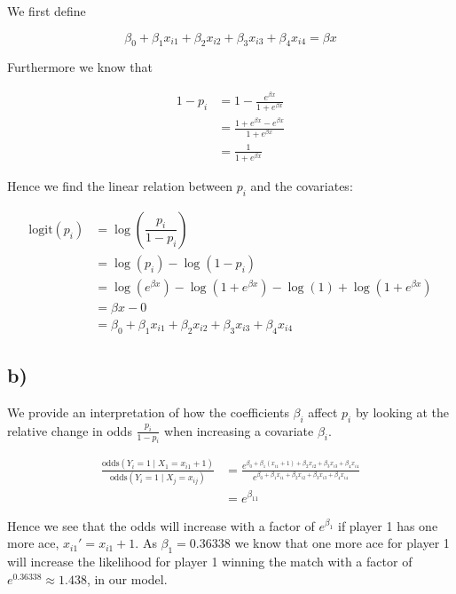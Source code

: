 \documentclass[
]{article}
\begin{document}
We first define

\[
\beta_0 + \beta_1x_{i1} + \beta_2 x_{i2} + \beta_3x_{i3} + \beta_4 x_{i4} = \beta x
\]

Furthermore we know that

\[
\begin{aligned}
1-p_i &= 1 - \frac{e^{\beta x}}{1+e^{\beta x}} \\
&= \frac{1 + e^{\beta x} - e^{\beta x}}{1+e^{\beta x}} \\
&= \frac{1}{1+e^{\beta x}}
\end{aligned}
\]

Hence we find the linear relation between \(p_i\) and the covariates:

\[
\begin{aligned}
\text{logit}(p_i) &= \log(\dfrac{p_i}{1-p_i}) \\
&=  \log(p_i) - \log({1 - p_i}) \\
&=  \log(e^{\beta x}) - \log(1 + e^{\beta x}) - \log(1) + \log({1 + e^{\beta x}}) \\
&= \beta x - 0 \\
&= \beta_0 + \beta_1x_{i1} + \beta_2 x_{i2} + \beta_3x_{i3} + \beta_4 x_{i4}
\end{aligned}
\]

\hypertarget{b-2}{%
\subsection{b)}\label{b-2}}

We provide an interpretation of how the coefficients \(\beta_i\) affect
\(p_i\) by looking at the relative change in odds \(\frac{p_i}{1-p_i}\)
when increasing a covariate \(\beta_i\).

\[
\begin{aligned}
\frac{\text{odds}(Y_i=1 \mid X_{1} = x_{i1} + 1)}{\text{odds}(Y_i=1 \mid X_j = x_{ij})} &= \frac{e^{\beta_0 + \beta_1 (x_{i1} + 1) + \beta_2 x_{i2} + \beta_3x_{i3} + \beta_4 x_{i4}}}{e^{\beta_0 + \beta_1x_{i1} + \beta_2 x_{i2} + \beta_3x_{i3} + \beta_4 x_{i4}}} \\
&= e^{\beta_11}
\end{aligned}
\]

Hence we see that the odds will increase with a factor of
\(e^{\beta_1}\) if player 1 has one more ace, \(x_{i1}' = x_{i1} + 1\).
As \(\beta_1 = 0.36338\) we know that one more ace for player 1 will
increase the likelihood for player 1 winning the match with a factor of
\(e^{0.36338} \approx 1.438\), in our model.
\end{document}
